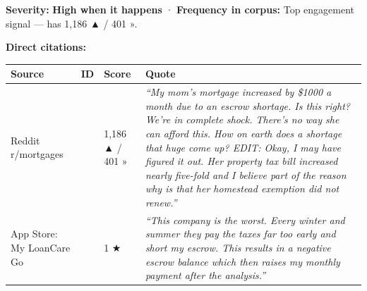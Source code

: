 \documentclass[
  10pt,
]{article}
\let\origtexttt\texttt
\renewcommand{\texttt}[1]{\origtexttt{\seqsplit{#1}}}
\begin{document}
\textbf{Severity:} \textbf{High when it happens} · \textbf{Frequency in corpus:} Top engagement
signal --- \texttt{1rnj2mi} has 1,186 ▲ / 401 ».

\textbf{Direct citations:}

\begin{longtable}[]{@{}llll@{}}
\toprule
\begin{minipage}[b]{0.20\columnwidth}\raggedright
Source\strut
\end{minipage} & \begin{minipage}[b]{0.14\columnwidth}\raggedright
ID\strut
\end{minipage} & \begin{minipage}[b]{0.10\columnwidth}\raggedright
Score\strut
\end{minipage} & \begin{minipage}[b]{0.44\columnwidth}\raggedright
Quote\strut
\end{minipage}\tabularnewline
\midrule
\endhead
\begin{minipage}[t]{0.20\columnwidth}\raggedright
Reddit r/mortgages\strut
\end{minipage} & \begin{minipage}[t]{0.14\columnwidth}\raggedright
\texttt{1rnj2mi}\strut
\end{minipage} & \begin{minipage}[t]{0.10\columnwidth}\raggedright
1,186 ▲ / 401 »\strut
\end{minipage} & \begin{minipage}[t]{0.44\columnwidth}\raggedright
\emph{``My mom's mortgage increased by \$1000 a month due to an escrow shortage. Is this right?
We're in complete shock. There's no way she can afford this. How on earth does a shortage that huge
come up? EDIT: Okay, I may have figured it out. Her property tax bill increased nearly five-fold and
I believe part of the reason why is that her homestead exemption did not renew.''}\strut
\end{minipage}\tabularnewline
\begin{minipage}[t]{0.20\columnwidth}\raggedright
App Store: My LoanCare Go\strut
\end{minipage} & \begin{minipage}[t]{0.14\columnwidth}\raggedright
\texttt{appstore\_6467651368\_13511459675}\strut
\end{minipage} & \begin{minipage}[t]{0.10\columnwidth}\raggedright
1 ★\strut
\end{minipage} & \begin{minipage}[t]{0.44\columnwidth}\raggedright
\emph{``This company is the worst. Every winter and summer they pay the taxes far too early and
short my escrow. This results in a negative escrow balance which then raises my monthly payment
after the analysis.''}\strut
\end{minipage}\tabularnewline
\bottomrule
\end{longtable}
\end{document}
